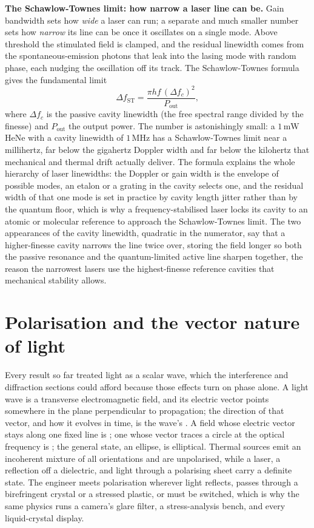 \begin{mastery}
\textbf{The Schawlow-Townes limit: how narrow a laser line can be.} Gain
bandwidth sets how \emph{wide} a laser can run; a separate and much smaller number
sets how \emph{narrow} its line can be once it oscillates on a single mode. Above
threshold the stimulated field is clamped, and the residual linewidth comes from
the spontaneous-emission photons that leak into the lasing mode with random phase,
each nudging the oscillation off its track. The Schawlow-Townes formula gives the
fundamental limit
\[
\Delta f_{\mathrm{ST}} = \frac{\pi h f\,(\Delta f_c)^2}{P_{\mathrm{out}}},
\]
where $\Delta f_c$ is the passive cavity linewidth (the free spectral range
divided by the finesse) and $P_{\mathrm{out}}$ the output power. The number is
astonishingly small: a $1\,\si{\milli\watt}$ HeNe with a cavity linewidth of
$1\,\si{\mega\hertz}$ has a Schawlow-Townes limit near a millihertz, far below the
gigahertz Doppler width and far below the kilohertz that mechanical and thermal
drift actually deliver. The formula explains the whole hierarchy of laser
linewidths: the Doppler or gain width is the envelope of possible modes, an etalon
or a grating in the cavity selects one, and the residual width of that one mode is
set in practice by cavity length jitter rather than by the quantum floor, which is
why a frequency-stabilised laser locks its cavity to an atomic or molecular
reference to approach the Schawlow-Townes limit. The two appearances of the cavity
linewidth, quadratic in the numerator, say that a higher-finesse cavity narrows
the line twice over, storing the field longer so both the passive resonance and the
quantum-limited active line sharpen together, the reason the narrowest lasers use
the highest-finesse reference cavities that mechanical stability allows.
\end{mastery}

\section{Polarisation and the vector nature of light}

Every result so far treated light as a scalar wave, which the interference and
diffraction sections could afford because those effects turn on phase alone. A
light wave is a transverse electromagnetic field, and its electric vector points
somewhere in the plane perpendicular to propagation; the direction of that vector,
and how it evolves in time, is the wave's . A field whose
electric vector stays along one fixed line is ; one
whose vector traces a circle at the optical frequency is ; the general state, an ellipse, is elliptical. Thermal sources emit an
incoherent mixture of all orientations and are unpolarised, while a laser, a
reflection off a dielectric, and light through a polarising sheet carry a definite
state. The engineer meets polarisation wherever light reflects, passes through a
birefringent crystal or a stressed plastic, or must be switched, which is why the
same physics runs a camera's glare filter, a stress-analysis bench, and every
liquid-crystal display.

